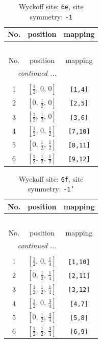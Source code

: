 \documentclass[fleqn,8pt]{jsarticle}
\begin{document}
\renewcommand{\arraystretch}{1.2}
\begin{longtable}{ccc}
\caption{Wyckoff site: {\tt 6e}, site symmetry: {\tt -1}}
 \\
 \hline \hline
No. & position & mapping \\ \hline \endfirsthead

\multicolumn{2}{l}{\tablename\ \thetable{}} \\
 \hline \hline
No. & position & mapping \\ \hline \endhead

 \hline \hline
\multicolumn{2}{r}{\footnotesize\it continued ...} \\ \endfoot

 \hline \hline
\multicolumn{2}{r}{} \\ \endlastfoot

1 & $\left[ \frac{1}{2},\, 0,\, 0 \right]$ & {\tt [1,4]} \\ \hline
2 & $\left[ 0,\, \frac{1}{2},\, 0 \right]$ & {\tt [2,5]} \\ \hline
3 & $\left[ \frac{1}{2},\, \frac{1}{2},\, 0 \right]$ & {\tt [3,6]} \\ \hline
4 & $\left[ \frac{1}{2},\, 0,\, \frac{1}{2} \right]$ & {\tt [7,10]} \\ \hline
5 & $\left[ 0,\, \frac{1}{2},\, \frac{1}{2} \right]$ & {\tt [8,11]} \\ \hline
6 & $\left[ \frac{1}{2},\, \frac{1}{2},\, \frac{1}{2} \right]$ & {\tt [9,12]} \\
\end{longtable}
\renewcommand{\arraystretch}{1.2}
\begin{longtable}{ccc}
\caption{Wyckoff site: {\tt 6f}, site symmetry: {\tt -1'}}
 \\
 \hline \hline
No. & position & mapping \\ \hline \endfirsthead

\multicolumn{2}{l}{\tablename\ \thetable{}} \\
 \hline \hline
No. & position & mapping \\ \hline \endhead

 \hline \hline
\multicolumn{2}{r}{\footnotesize\it continued ...} \\ \endfoot

 \hline \hline
\multicolumn{2}{r}{} \\ \endlastfoot

1 & $\left[ \frac{1}{2},\, 0,\, \frac{1}{4} \right]$ & {\tt [1,10]} \\ \hline
2 & $\left[ 0,\, \frac{1}{2},\, \frac{1}{4} \right]$ & {\tt [2,11]} \\ \hline
3 & $\left[ \frac{1}{2},\, \frac{1}{2},\, \frac{1}{4} \right]$ & {\tt [3,12]} \\ \hline
4 & $\left[ \frac{1}{2},\, 0,\, \frac{3}{4} \right]$ & {\tt [4,7]} \\ \hline
5 & $\left[ 0,\, \frac{1}{2},\, \frac{3}{4} \right]$ & {\tt [5,8]} \\ \hline
6 & $\left[ \frac{1}{2},\, \frac{1}{2},\, \frac{3}{4} \right]$ & {\tt [6,9]} \\
\end{longtable}
\end{document}
